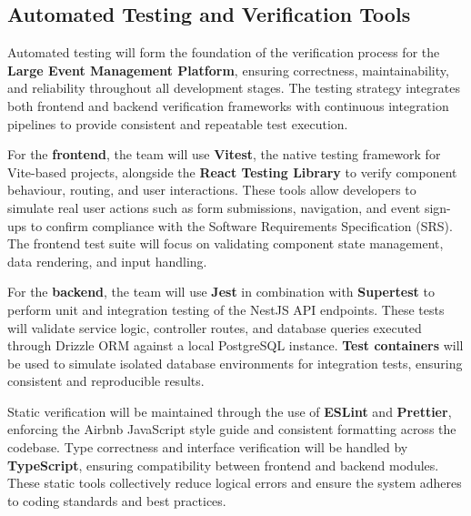 \documentclass[12pt, titlepage]{article}
\begin{document}



\subsection{Automated Testing and Verification Tools}

Automated testing will form the foundation of the verification process for the \textbf{Large Event Management Platform}, ensuring correctness, maintainability, and reliability throughout all development stages. The testing strategy integrates both frontend and backend verification frameworks with continuous integration pipelines to provide consistent and repeatable test execution.

For the \textbf{frontend}, the team will use \textbf{Vitest}, the native testing framework for Vite-based projects, alongside the \textbf{React Testing Library} to verify component behaviour, routing, and user interactions. These tools allow developers to simulate real user actions such as form submissions, navigation, and event sign-ups to confirm compliance with the Software Requirements Specification (SRS). The frontend test suite will focus on validating component state management, data rendering, and input handling.

For the \textbf{backend}, the team will use \textbf{Jest} in combination with \textbf{Supertest} to perform unit and integration testing of the NestJS API endpoints. These tests will validate service logic, controller routes, and database queries executed through Drizzle ORM against a local PostgreSQL instance. \textbf{Test containers} will be used to simulate isolated database environments for integration tests, ensuring consistent and reproducible results.

Static verification will be maintained through the use of \textbf{ESLint} and \textbf{Prettier}, enforcing the Airbnb JavaScript style guide and consistent formatting across the codebase. Type correctness and interface verification will be handled by \textbf{TypeScript}, ensuring compatibility between frontend and backend modules. These static tools collectively reduce logical errors and ensure the system adheres to coding standards and best practices.
\end{document}
